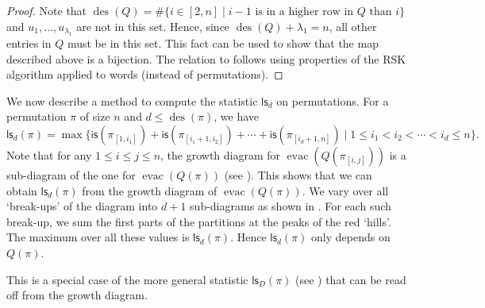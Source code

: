 \documentclass[12pt]{article}
\newcommand{\is}{\mathsf{is}}
\newcommand{\ls}{\mathsf{ls}}
\newcommand{\des}{\operatorname{des}}
\newcommand{\evac}{\operatorname{evac}}
\theoremstyle{definition}
\begin{document}
\begin{proof}
    Note that $\des(Q) = \#\{i \in [2, n] \mid i - 1\text{ is in a higher row in $Q$ than }i\}$ and $u_1, \ldots, u_{\lambda_1}$ are not in this set. 
    Hence, since $\des(Q) + \lambda_1 = n$, all other entries in $Q$ must be in this set. 
    This fact can be used to show that the map described above is a bijection. 
    The relation to \cite[\href{https://oeis.org/A268699}{A268699}]{oeis} follows using properties of the RSK algorithm applied to words (instead of permutations).
\end{proof}

We now describe a method to compute the statistic $\ls_d$ on permutations. 
For a permutation $\pi$ of size $n$ and $d \leq \des(\pi)$, we have
\begin{equation*}
    \ls_d(\pi) = \operatorname{max}\{\is(\pi_{[1, i_1]}) + \is(\pi_{[i_1 + 1, i_2]}) + \cdots + \is(\pi_{[i_d + 1, n]}) \mid 1 \leq i_1 < i_2 < \cdots < i_d \leq n\}.
\end{equation*}
Note that for any $1 \leq i \leq j \leq n$, the growth diagram for $\evac(Q(\pi_{[i, j]}))$ is a sub-diagram of the one for $\evac(Q(\pi))$ (see ). 
This shows that we can obtain $\ls_d(\pi)$ from the growth diagram of $\evac(Q(\pi))$. 
We vary over all `break-ups' of the diagram into $d + 1$ sub-diagrams as shown in . 
For each such break-up, we sum the first parts of the partitions at the peaks of the red `hills'. 
The maximum over all these values is $\ls_d(\pi)$. 
Hence $\ls_d(\pi)$ only depends on $Q(\pi)$.

This is a special case of the more general statistic $\ls_D(\pi)$ (see ) that can be read off from the growth diagram.
\end{document}
